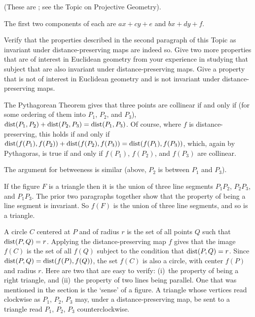 \begin{exercises}
    (These are 
     ;
     see the Topic on Projective Geometry).
     \begin{answer}
       The first two components of each are $ax+cy+e$ and $bx+dy+f$.
     \end{answer}
  \item \label{exer:GeomInvDistPre}
    \begin{exparts}
     \partsitem Verify that the properties described 
       in the second paragraph of this Topic as invariant
       under distance-preserving maps are indeed so.
     \partsitem Give two more properties that are of interest 
       in Euclidean geometry from your experience in studying that
       subject that are also invariant under distance-preserving maps.
     \partsitem Give a property that is not of interest in Euclidean 
       geometry and is not invariant under distance-preserving maps.
    \end{exparts}
    \begin{answer}
      \begin{exparts}
        \partsitem The Pythagorean Theorem gives that
          three points are 
          collinear if and only if
          (for some ordering of them into $P_1$, $P_2$, and $P_3$),
          $\operatorname{dist}(P_1,P_2)+\operatorname{dist}(P_2,P_3)=\operatorname{dist}(P_1,P_3)$.
          Of course, where $f$ is distance-preserving, this holds
          if and only if
          $\operatorname{dist}(f(P_1),f(P_2))+\operatorname{dist}(f(P_2),f(P_3))=\operatorname{dist}(f(P_1),f(P_3))$,
          which, again by Pythagoras, is true if and only if
          $f(P_1)$, $f(P_2)$, and $f(P_3)$ are collinear.
        
          The argument for betweeness is similar (above, $P_2$ is 
          between $P_1$ and $P_3$).

          If the figure $F$ is a triangle then it is the union of three
          line segments $P_1P_2$, $P_2P_3$, and $P_1P_3$.
          The prior two paragraphs together show that the property of
          being a line segment is invariant.
          So $f(F)$ is the union of three line segments, and so is a 
          triangle.

          A circle $C$ centered at $P$ and of radius $r$ is the set of
          all points $Q$ such that $\operatorname{dist}(P,Q)=r$.
          Applying the distance-preserving map $f$ gives that the image
          $f(C)$ is the set of all $f(Q)$ subject to the condition that
          $\operatorname{dist}(P,Q)=r$.
          Since $\operatorname{dist}(P,Q)=\operatorname{dist}(f(P),f(Q))$, the set $f(C)$ is also
          a circle, with center $f(P)$ and radius $r$.
        \partsitem Here are two that are easy to verify: (i)~the
          property of being a right triangle, and (ii)~the property of
          two lines being parallel.
        \partsitem One that was mentioned in the section is the `sense' of
          a figure.
          A triangle whose vertices read clockwise as $P_1$, $P_2$, $P_3$
          may, under a distance-preserving map, be sent to a triangle
          read $P_1$, $P_2$, $P_3$ counterclockwise.
      \end{exparts}
    \end{answer}
\end{exercises}
\endinput

